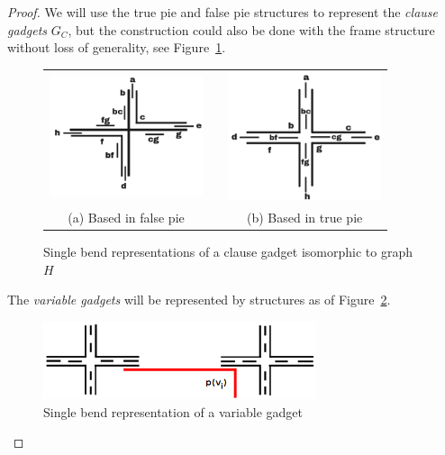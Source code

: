 \documentclass[
submission
]{dmtcs-episciences}
\begin{document}
\begin{proof}
We will use the true pie and false pie structures to represent the \textit{clause gadgets} $ G_C$, but the construction could also be done with the frame structure without loss of generality, see Figure~\ref{fig:falseAndTruePie}.  


%
\begin{figure}[htb]
  \centering
  \begin{tabular}{c c c }
    \includegraphics[width=4.5cm]{falsePie}  %
    & &\includegraphics[width=4.5cm]{truePie} %
    \\%
    {\footnotesize (a) Based in false pie}  & &  {\footnotesize(b) Based in true pie}\\
  \end{tabular}
  \caption{Single bend representations of a clause gadget isomorphic to graph $H$
  }\label{fig:falseAndTruePie}
\end{figure} 

The \textit{variable gadgets} will be represented by structures as of Figure~\ref{fig:gadgetVariavel}.

%
\begin{figure}[htb]	
\center%
\includegraphics[width=8cm]{gadgetVariavel2}
\caption{Single bend representation of a variable gadget}
\label{fig:gadgetVariavel}
\end{figure}



\end{proof}
\end{document}
